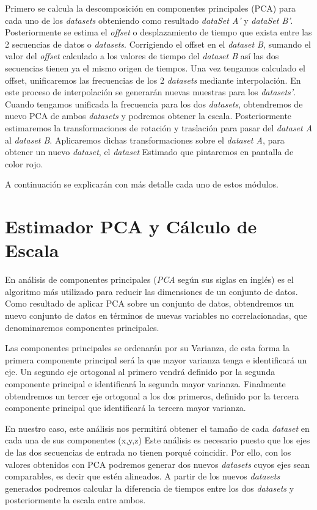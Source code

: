 Primero se calcula la descomposición en componentes principales (PCA) para cada uno de los \textit{datasets} obteniendo como resultado \textit{dataSet A'} y \textit{dataSet B'}. Posteriormente se estima el \textit{offset} o desplazamiento de tiempo que exista entre las 2 secuencias de datos o \textit{datasets}. Corrigiendo el offset en el \textit{dataset B}, sumando el valor del \textit{offset} calculado a los valores de tiempo del \textit{dataset B} así las dos secuencias tienen ya el mismo origen de tiempos. Una vez tengamos calculado el offset, unificaremos las frecuencias de los 2 \textit{datasets} mediante interpolación. En este proceso de interpolación se generarán nuevas muestras para los \textit{datasets'}.
Cuando tengamos unificada la frecuencia para los dos \textit{datasets}, obtendremos de nuevo PCA de ambos \textit{datasets} y podremos obtener la escala.
Posteriormente estimaremos la transformaciones de rotación y traslación para pasar del \textit{dataset A} al \textit{dataset B}. Aplicaremos dichas transformaciones sobre el \textit{dataset A}, para obtener un nuevo \textit{dataset}, el \textit{dataset} Estimado que pintaremos en pantalla de color rojo.

A continuación se explicarán con más detalle cada uno de estos módulos.


\section{Estimador PCA y Cálculo de Escala}
    En análisis de componentes principales (\textit{PCA} según sus siglas en inglés) es el algoritmo más utilizado para reducir las dimensiones de un conjunto de datos. Como resultado de aplicar PCA sobre un conjunto de datos, obtendremos un nuevo conjunto de datos en términos de nuevas variables no correlacionadas, que denominaremos componentes principales.

    Las componentes principales se ordenarán por su Varianza, de esta forma la primera componente principal será la que mayor varianza tenga e identificará un eje. Un segundo eje ortogonal al primero vendrá definido por la segunda componente principal e identificará la segunda mayor varianza. Finalmente obtendremos un tercer eje ortogonal a los dos primeros, definido por la tercera componente principal que identificará la tercera mayor varianza.

    En nuestro caso, este análisis nos permitirá obtener el tamaño de cada \textit{dataset} en cada una de sus componentes (x,y,z)
	Este análisis es necesario puesto que los ejes de las dos secuencias de entrada no tienen porqué coincidir. Por ello, con los valores obtenidos con PCA podremos generar dos nuevos \textit{datasets} cuyos ejes sean comparables, es decir que estén alineados. A partir de los nuevos \textit{datasets} generados podremos calcular la diferencia de tiempos entre los dos \textit{datasets} y posteriormente la escala entre ambos.
 

